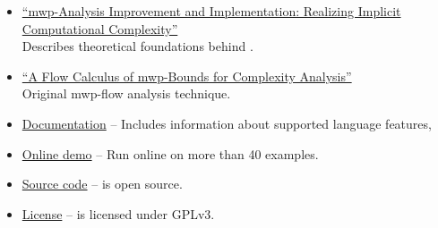 \begin{itemize}

\item \href{https://doi.org/10.4230/LIPIcs.FSCD.2022.26}%
{\enquote{mwp-Analysis Improvement and Implementation: Realizing Implicit
Computational Complexity}}\\
Describes theoretical foundations behind .

\item \href{https://doi.org/10.1145/1555746.1555752}%
{\enquote{A Flow Calculus of mwp-Bounds for Complexity
Analysis}}\\
Original mwp-flow analysis technique.

\item \href{https://statycc.github.io/pymwp}{Documentation} --
Includes information about supported  language features, \etc

\item \href{https://statycc.github.io/pymwp/demo/}{Online demo} --
Run  online on more than 40 examples.

\item \href{https://github.com/statycc/pymwp}{Source code} --
 is open source.

\item \href{https://github.com/statycc/pymwp/blob/main/LICENSE}{License} --
 is licensed under GPLv3.

\end{itemize}
